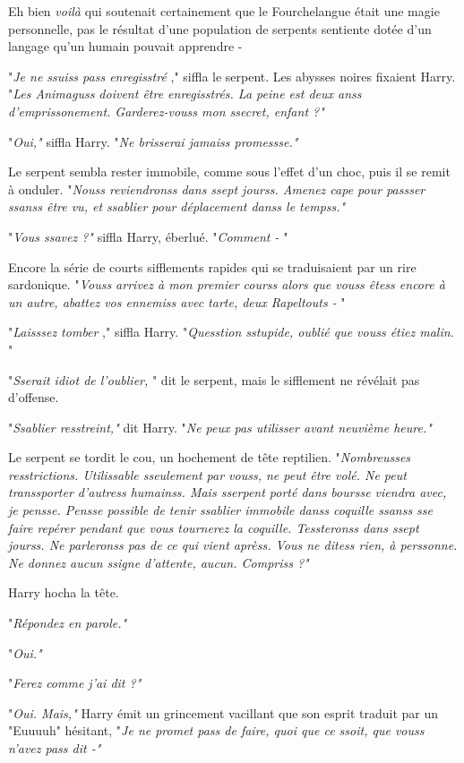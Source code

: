 Eh bien \emph{voilà}  qui soutenait certainement que le Fourchelangue était une magie personnelle, pas le résultat d'une population de serpents sentiente dotée d'un langage qu'un humain pouvait apprendre -

"\emph{Je ne ssuiss pass enregisstré} ," siffla le serpent. Les abysses noires fixaient Harry. "\emph{Les Animaguss doivent être enregisstrés. La peine est deux anss d'emprissonement. Garderez-vouss mon ssecret, enfant ?"} 

"\emph{Oui," } siffla Harry. "\emph{Ne brisserai jamaiss promessse."} 

Le serpent sembla rester immobile, comme sous l'effet d'un choc, puis il se remit à onduler. "\emph{Nouss reviendronss dans ssept jourss. Amenez cape pour passser ssanss être vu, et ssablier pour déplacement danss le tempss."} 

"\emph{Vous ssavez ?"}  siffla Harry, éberlué. "\emph{Comment -} "

Encore la série de courts sifflements rapides qui se traduisaient par un rire sardonique. "\emph{Vouss arrivez à mon premier courss alors que vouss êtess encore à un autre, abattez vos ennemiss avec tarte, deux Rapeltouts -} "

"\emph{Laisssez tomber} ," siffla Harry. "\emph{Quesstion sstupide, oublié que vouss étiez malin.} "

"\emph{Sserait idiot de l'oublier,} " dit le serpent, mais le sifflement ne révélait pas d'offense.

"\emph{Ssablier resstreint,"}  dit Harry. "\emph{Ne peux pas utilisser avant neuvième heure."} 

Le serpent se tordit le cou, un hochement de tête reptilien. "\emph{Nombreusses resstrictions. Utilissable sseulement par vouss, ne peut être volé. Ne peut transsporter d'autress humainss. Mais sserpent porté dans boursse viendra avec, je pensse. Pensse possible de tenir ssablier immobile danss coquille ssanss sse faire repérer pendant que vous tournerez la coquille. Tessteronss dans ssept jourss. Ne parleronss pas de ce qui vient aprèss. Vous ne ditess rien, à perssonne. Ne donnez aucun ssigne d'attente, aucun. Compriss ?"} 

Harry hocha la tête.

"\emph{Répondez en parole."} 

"\emph{Oui."} 

"\emph{Ferez comme j'ai dit ?"} 

"\emph{Oui. Mais," } Harry émit un grincement vacillant que son esprit traduit par un "Euuuuh" hésitant, "\emph{Je ne promet pass de faire, quoi que ce ssoit, que vouss n'avez pass dit -"} 

